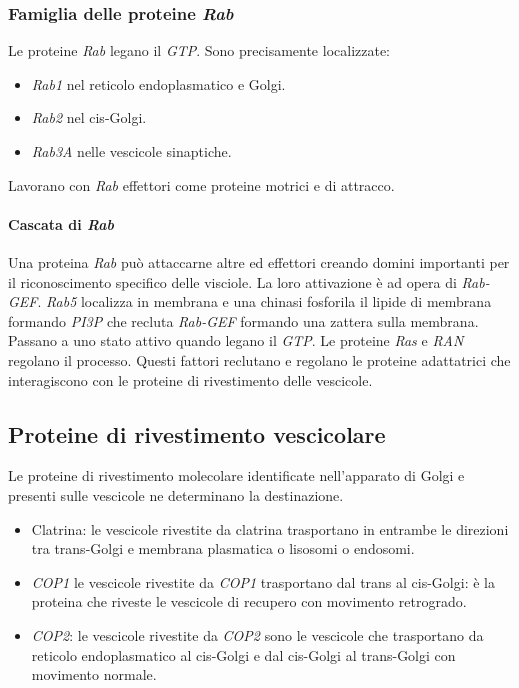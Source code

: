 		\subsubsection{Famiglia delle proteine \emph{Rab}}
		Le proteine \emph{Rab} legano il \emph{GTP}.
		Sono precisamente localizzate:
		\begin{multicols}{3}
			\begin{itemize}
				\item \emph{Rab1} nel reticolo endoplasmatico e Golgi.
				\item \emph{Rab2} nel cis-Golgi.
				\item \emph{Rab3A} nelle vescicole sinaptiche.
			\end{itemize}
		\end{multicols}
		Lavorano con \emph{Rab} effettori come proteine motrici e di attracco.

			\paragraph{Cascata di \emph{Rab}}
			Una proteina \emph{Rab} pu\`o attaccarne altre ed effettori creando domini importanti per il riconoscimento specifico delle visciole.
			La loro attivazione \`e ad opera di \emph{Rab-GEF}.
			\emph{Rab5} localizza in membrana e una chinasi fosforila il lipide di membrana formando \emph{PI3P} che recluta \emph{Rab-GEF} formando una zattera sulla membrana.
			Passano a uno stato attivo quando legano il \emph{GTP}.
			Le proteine \emph{Ras} e \emph{RAN} regolano il processo.
			Questi fattori reclutano e regolano le proteine adattatrici che interagiscono con le proteine di rivestimento delle vescicole.

	\subsection{Proteine di rivestimento vescicolare}
	Le proteine di rivestimento molecolare identificate nell'apparato di Golgi e presenti sulle vescicole ne determinano la destinazione.
	\begin{multicols}{2}
		\begin{itemize}
			\item Clatrina: le vescicole rivestite da clatrina trasportano in entrambe le direzioni tra trans-Golgi e membrana plasmatica o lisosomi o endosomi.
			\item \emph{COP1} le vescicole rivestite da \emph{COP1} trasportano dal trans al cis-Golgi: \`e la proteina che riveste le vescicole di recupero con movimento retrogrado.
			\item \emph{COP2}: le vescicole rivestite da \emph{COP2} sono le vescicole che trasportano da reticolo endoplasmatico al cis-Golgi e dal cis-Golgi al trans-Golgi con movimento normale.
		\end{itemize}
	\end{multicols}

